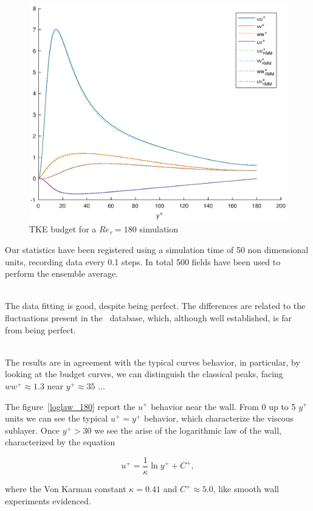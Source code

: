 \begin{figure}
\begin{center}
\includegraphics[scale=0.55]{grafici/budget_180.eps}
\caption{TKE budget for a $Re_{\tau}=180$ simulation}
\label{budget_180}
\end{center} 
\end{figure}


Our statistics have been registered using a simulation time of 50 non dimensional units, recording data every 0.1 steps.
In total 500 fields have been used to perform the ensemble average. \\~\par

The data fitting is good, despite being perfect. The differences are related to the fluctuations present in the~\cite{kim_moin_moser} database, which, although well established, is far from being perfect. \\~\par

The results are in agreement with the typical curves behavior, in particular, by looking at the budget curves, we can distinguish the classical peaks, facing $ww^{+} \approx 1.3$ near $y^{+} \approx 35$  ... \par
The figure~\ref{loglaw_180} report the $u^{+}$ behavior near the wall. From 0 up to 5 $y^{+}$ units we can see the typical $u^{+}=y^{+}$ behavior, which characterize the viscous sublayer. Once $y^{+}>30$ we see the arise of the logarithmic law of the wall, characterized by the equation

\begin{equation*}
u^{+} = \frac{1}{\kappa} \ln y^{+} +C^{+},
\end{equation*}

where the Von Karman constant $\kappa=0.41$ and $C^{+}\approx 5.0$, like smooth wall experiments evidenced.
